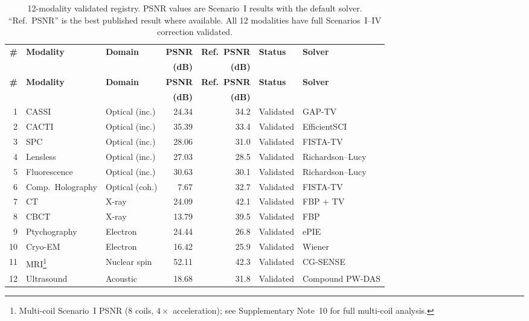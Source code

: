 \documentclass[11pt]{article}
\theoremstyle{definition}
\begin{document}
\begin{longtable}{r l l r r l l}
\caption{12-modality validated registry.  PSNR values are Scenario~I results
with the default solver.  ``Ref.\ PSNR'' is the best published result where
available.  All 12 modalities have full Scenarios~I--IV correction validated.}
\label{tab:26mod} \\
\toprule
\textbf{\#} & \textbf{Modality} & \textbf{Domain} &
  \textbf{PSNR} & \textbf{Ref.\ PSNR} & \textbf{Status} & \textbf{Solver} \\
  & & & \textbf{(dB)} & \textbf{(dB)} & & \\
\midrule
\endfirsthead
\toprule
\textbf{\#} & \textbf{Modality} & \textbf{Domain} &
  \textbf{PSNR} & \textbf{Ref.\ PSNR} & \textbf{Status} & \textbf{Solver} \\
  & & & \textbf{(dB)} & \textbf{(dB)} & & \\
\midrule
\endhead
\bottomrule
\endlastfoot
1  & CASSI                & Optical (inc.) & 24.34 & 34.2  & Validated & GAP-TV \\
2  & CACTI                & Optical (inc.) & 35.39 & 33.4  & Validated & EfficientSCI \\
3  & SPC                  & Optical (inc.) & 28.06 & 31.0  & Validated & FISTA-TV \\
4  & Lensless             & Optical (inc.) & 27.03 & 28.5  & Validated & Richardson--Lucy \\
5  & Fluorescence         & Optical (inc.) & 30.63 & 30.1  & Validated & Richardson--Lucy \\
6  & Comp.\ Holography    & Optical (coh.) &  7.67 & 32.7  & Validated & FISTA-TV \\
7  & CT                   & X-ray          & 24.09 & 42.1  & Validated & FBP + TV \\
8  & CBCT                 & X-ray          & 13.79 & 39.5  & Validated & FBP \\
9  & Ptychography         & Electron       & 24.44 & 26.8  & Validated & ePIE \\
10 & Cryo-EM              & Electron       & 16.42 & 25.9  & Validated & Wiener \\
11 & MRI\footnote{Multi-coil Scenario~I PSNR (8 coils, $4\times$ acceleration); see Supplementary Note~10 for full multi-coil analysis.} & Nuclear spin & 52.11 & 42.3 & Validated & CG-SENSE \\
12 & Ultrasound           & Acoustic       & 18.68 & 31.8  & Validated & Compound PW-DAS \\
\end{longtable}
\end{document}
